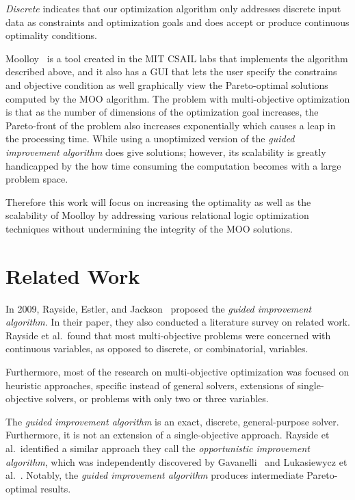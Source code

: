 \documentclass[11pt]{article}
\begin{document}
\textit{Discrete} indicates that our optimization algorithm only
addresses discrete input data as constraints and optimization goals and
does accept or produce continuous optimality conditions.

Moolloy~\cite{ref:Rayside09} is a tool created in the MIT CSAIL labs that
implements the algorithm described above, and it also has a GUI that
lets the user specify the constrains and objective condition as well
graphically view the Pareto-optimal solutions computed by the MOO
algorithm. The problem with multi-objective optimization is that as the
number of dimensions of the optimization goal increases, the
Pareto-front of the problem also increases exponentially which causes a
leap in the processing time. While using a unoptimized version of the
\textit{guided improvement algorithm} does give solutions; however, its
scalability is greatly handicapped by the how time consuming the
computation becomes with a large problem space.

Therefore this work will focus on increasing the optimality as well as
the scalability of Moolloy by addressing various relational logic
optimization techniques without undermining the integrity of the MOO
solutions.

\section{Related Work}

In 2009, Rayside, Estler, and Jackson~\cite{ref:Rayside09} proposed the
\textit{guided improvement algorithm}. In their paper, they also
conducted a literature survey on related work. Rayside et al.\ found
that most multi-objective problems were concerned with continuous
variables, as opposed to discrete, or combinatorial, variables.

Furthermore, most of the research on multi-objective optimization was
focused on heuristic approaches, specific instead of general solvers,
extensions of single-objective solvers, or problems with only two or
three variables.

The \textit{guided improvement algorithm} is an exact, discrete,
general-purpose solver. Furthermore, it is not an extension of a
single-objective approach. Rayside et al.\ identified a similar
approach they call the \textit{opportunistic improvement algorithm},
which was independently discovered by Gavanelli~\cite{ref:Gavanelli02}
and Lukasiewycz et al.~\cite{ref:Lukas07}. Notably, the \textit{guided
improvement algorithm} produces intermediate Pareto-optimal results.
\end{document}
